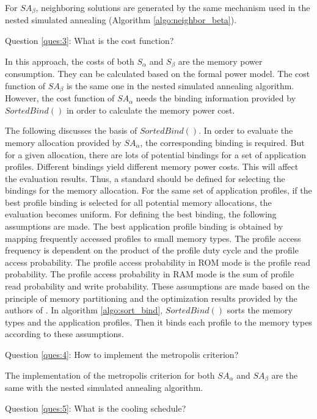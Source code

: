 		For $SA_{\beta}$, neighboring solutions are generated by the same mechanism used
		in the nested simulated annealing (Algorithm \ref{algo:neighbor_beta}).
				
		Question \ref{ques:3}: What is the cost function?
		
		In this approach, the costs of both $S_{\alpha}$ and $S_{\beta}$
		are the memory power consumption. They can be calculated based on the formal
		power model. The cost function of $SA_{\beta}$ is the same one in the nested
		simulated annealing algorithm.
		However, the cost function of $SA_{\alpha}$ needs the binding information
		provided by $SortedBind()$ in order to calculate the memory power cost.
		
		The following discusses the basis of $SortedBind()$.
		In order to evaluate the memory allocation provided by $SA_{\alpha}$,
		the corresponding binding is required. But for a given allocation,
		there are lots of potential bindings for a set of application profiles.
		Different bindings yield different memory power costs. This will affect
		the evaluation results.
		Thus, a standard should be defined for selecting the bindings for the
		memory allocation. For the same set of application profiles, if the
		best profile binding is selected for all potential memory allocations, the
		evaluation becomes uniform. For defining the best binding, the following
		assumptions are made.
		The best application profile binding is obtained by mapping frequently
		accessed profiles to small memory types. The profile access frequency
		is dependent on the product of the profile duty cycle and the profile access
		probability. The profile access probability in ROM mode is the profile
		read probability. The profile access probability in RAM mode is the
		sum of profile read probability and write probability.
		These assumptions are made based on the principle of memory partitioning and the
		optimization results provided by the authors of \cite{Strobel2016}.
		In algorithm \ref{algo:sort_bind}, $SortedBind()$ sorts the memory types and
		the application profiles. Then it binds each profile to the memory types
		according to these assumptions.
		 
		Question \ref{ques:4}: How to implement the metropolis criterion?
		
		The implementation of the metropolis criterion for both $SA_{\alpha}$
		and $SA_{\beta}$ are the same with the nested simulated annealing algorithm.
		
		Question \ref{ques:5}: What is the cooling schedule?
		
